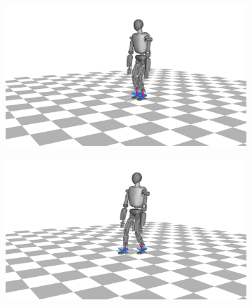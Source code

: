 \begin{figure}[h!]
\begin{subfigure}{.5\textwidth}
	\includegraphics[width=1\linewidth]{fig/walkDynamic/snaps/1}
	\caption{}
	\end{subfigure}%
\begin{subfigure}{.5\textwidth}
	\includegraphics[width=1\linewidth]{fig/walkDynamic/snaps/4}
	\caption{}
\end{subfigure}%


\end{figure}

